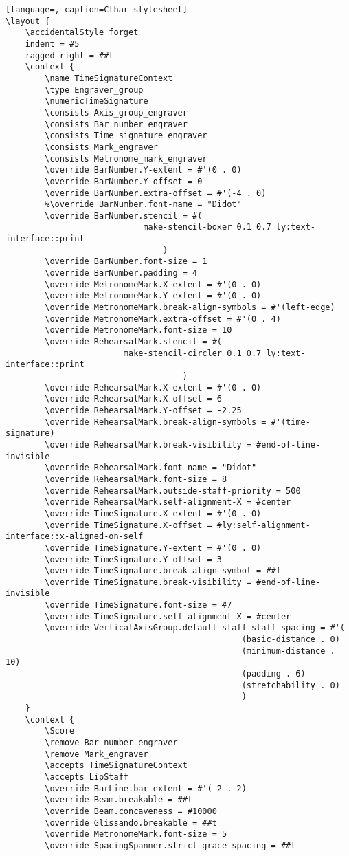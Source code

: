 \begin{lstlisting}[language=, caption=Cthar stylesheet]
\layout {
    \accidentalStyle forget
    indent = #5
    ragged-right = ##t
	\context {
        \name TimeSignatureContext
        \type Engraver_group
        \numericTimeSignature
        \consists Axis_group_engraver
		\consists Bar_number_engraver
        \consists Time_signature_engraver
		\consists Mark_engraver
		\consists Metronome_mark_engraver
		\override BarNumber.Y-extent = #'(0 . 0)
		\override BarNumber.Y-offset = 0
		\override BarNumber.extra-offset = #'(-4 . 0)
		%\override BarNumber.font-name = "Didot"
		\override BarNumber.stencil = #(
							make-stencil-boxer 0.1 0.7 ly:text-interface::print
								)
		\override BarNumber.font-size = 1
		\override BarNumber.padding = 4
		\override MetronomeMark.X-extent = #'(0 . 0)
		\override MetronomeMark.Y-extent = #'(0 . 0)
		\override MetronomeMark.break-align-symbols = #'(left-edge)
		\override MetronomeMark.extra-offset = #'(0 . 4)
		\override MetronomeMark.font-size = 10
		\override RehearsalMark.stencil = #(
						make-stencil-circler 0.1 0.7 ly:text-interface::print
									)
		\override RehearsalMark.X-extent = #'(0 . 0)
		\override RehearsalMark.X-offset = 6
		\override RehearsalMark.Y-offset = -2.25
		\override RehearsalMark.break-align-symbols = #'(time-signature)
		\override RehearsalMark.break-visibility = #end-of-line-invisible
		\override RehearsalMark.font-name = "Didot"
		\override RehearsalMark.font-size = 8
		\override RehearsalMark.outside-staff-priority = 500
		\override RehearsalMark.self-alignment-X = #center
        \override TimeSignature.X-extent = #'(0 . 0)
        \override TimeSignature.X-offset = #ly:self-alignment-interface::x-aligned-on-self
        \override TimeSignature.Y-extent = #'(0 . 0)
		\override TimeSignature.Y-offset = 3
        \override TimeSignature.break-align-symbol = ##f
        \override TimeSignature.break-visibility = #end-of-line-invisible
        \override TimeSignature.font-size = #7
        \override TimeSignature.self-alignment-X = #center
        \override VerticalAxisGroup.default-staff-staff-spacing = #'(
												(basic-distance . 0) 
												(minimum-distance . 10) 
												(padding . 6) 
												(stretchability . 0)
												)
    }
    \context {
        \Score
        \remove Bar_number_engraver
		\remove Mark_engraver
        \accepts TimeSignatureContext
		\accepts LipStaff
		\override BarLine.bar-extent = #'(-2 . 2)
        \override Beam.breakable = ##t
		\override Beam.concaveness = #10000
		\override Glissando.breakable = ##t
		\override MetronomeMark.font-size = 5
        \override SpacingSpanner.strict-grace-spacing = ##t

\end{lstlisting}
